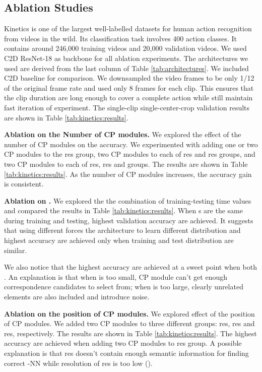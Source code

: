 \documentclass[10pt,twocolumn,letterpaper]{article}
\begin{document}
\subsection{Ablation Studies }
\label{sec:ablation:studies}
Kinetics \cite{Kinetics} is one of the largest well-labelled datasets for human action recognition from videos in the wild. Its classification task involves 400 action classes. It contains around 246,000 training videos and 20,000 validation videos.
We used C2D ResNet-18 as backbone for all ablation experiments. The architectures we used are derived from the last column of Table \ref{tab:architectures}. We included C2D baseline for comparison. 
We downsampled the video frames to be only 1/12 of the original frame rate and used only 8 frames for each clip. This ensures that the clip duration are long enough to cover a complete action while still maintain fast iteration of experiment. The single-clip single-center-crop validation results are shown in Table \ref{tab:kinetics:results}.

\textbf{Ablation on the Number of CP modules.} We explored the effect of the number of CP modules on the accuracy. We experimented with adding one or two CP modules to the res group, two CP modules to each of res and res groups, and two CP modules to each of  res, res and  groups. The results are shown in Table \ref{tab:kinetics:results}. As the number of CP modules increases, the accuracy gain is consistent.

\textbf{Ablation on \boldmath{}.} We explored the the combination of training-testing time  values and compared the results in Table \ref{tab:kinetics:results}. When s are the same during training and testing, highest validation accuracy are achieved. It suggests that using different  forces the architecture to learn different distribution and highest accuracy are achieved only when training and test distribution are similar. 

We also notice that the highest accuracy are achieved at a sweet point when both . An explanation is that when  is too small, CP module can't get enough correspondence candidates to select from; when  is too large, clearly unrelated elements are also included and introduce noise.


\textbf{Ablation on the position of CP modules.} We explored effect of the position of CP modules. We added two CP modules to three different groups: res, res and res, respectively. The results are shown in Table \ref{tab:kinetics:results}. The highest accuracy are achieved when adding two CP modules to res group. A possible explanation is that res doesn't contain enough semantic information for finding correct -NN while resolution of res  is too low ().
\end{document}
